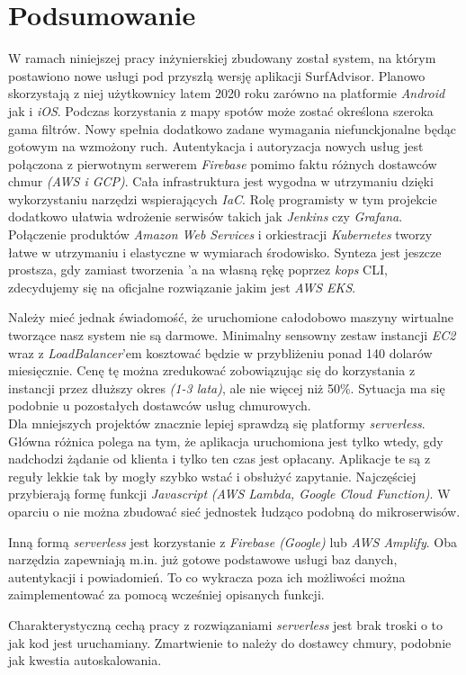 \chapter{Podsumowanie}
\label{cha:summary}

W ramach niniejszej pracy inżynierskiej zbudowany został system, na którym postawiono nowe usługi pod przyszłą wersję aplikacji SurfAdvisor.
Planowo skorzystają z niej użytkownicy latem 2020 roku zarówno na platformie \emph{Android} jak i \emph{iOS}. 
Podczas korzystania z mapy spotów może zostać określona szeroka gama filtrów. 
Nowy  spełnia dodatkowo zadane wymagania niefunckjonalne będąc gotowym na wzmożony ruch.
Autentykacja i autoryzacja nowych usług jest połączona z pierwotnym serwerem \emph{Firebase} pomimo faktu różnych dostawców chmur \emph{(AWS i GCP)}.
Cała infrastruktura jest wygodna w utrzymaniu dzięki wykorzystaniu narzędzi wspierających \emph{IaC}.
Rolę programisty w tym projekcie dodatkowo ułatwia wdrożenie serwisów takich jak \emph{Jenkins} czy \emph{Grafana}.\\


Połączenie produktów \emph{Amazon Web Services} i orkiestracji \emph{Kubernetes} tworzy łatwe w utrzymaniu i elastyczne w wymiarach środowisko.
Synteza jest jeszcze prostsza, gdy zamiast tworzenia 'a na własną rękę poprzez \emph{kops} CLI, zdecydujemy się na oficjalne rozwiązanie jakim jest \emph{AWS EKS}.


Należy mieć jednak świadomość, że uruchomione całodobowo maszyny wirtualne tworzące nasz system nie są darmowe.
Minimalny sensowny zestaw instancji \emph{EC2} wraz z \emph{LoadBalancer}'em kosztować będzie w przybliżeniu ponad 140 dolarów miesięcznie.
Cenę tę można zredukować zobowiązując się do korzystania z instancji przez dłuższy okres \emph{(1-3 lata)}, ale nie więcej niż 50\%.
Sytuacja ma się podobnie u pozostałych dostawców usług chmurowych.\\


Dla mniejszych projektów znacznie lepiej sprawdzą się platformy \emph{serverless}.
Główna różnica polega na tym, że aplikacja uruchomiona jest tylko wtedy, gdy nadchodzi żądanie od klienta i tylko ten czas jest opłacany.
Aplikacje te są z reguły lekkie tak by mogły szybko wstać i obsłużyć zapytanie.
Najczęściej przybierają formę funkcji \emph{Javascript} \emph{(AWS Lambda, Google Cloud Function)}.
W oparciu o nie można zbudować sieć jednostek łudząco podobną do mikroserwisów.


Inną formą \emph{serverless} jest korzystanie z \emph{Firebase (Google)} lub \emph{AWS Amplify}.
Oba narzędzia zapewniają m.in. już gotowe podstawowe usługi baz danych, autentykacji i powiadomień.
To co wykracza poza ich możliwości można zaimplementować za pomocą wcześniej opisanych funkcji.


Charakterystyczną cechą pracy z rozwiązaniami \emph{serverless} jest brak troski o to jak kod jest uruchamiany.
Zmartwienie to należy do dostawcy chmury, podobnie jak kwestia autoskalowania.






